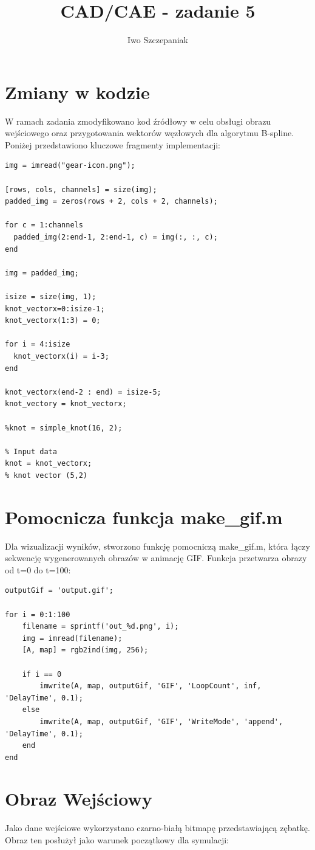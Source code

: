 \documentclass{article}
\title{CAD/CAE - zadanie 5}
\author{Iwo Szczepaniak}
\begin{document}
\maketitle

\section{Zmiany w kodzie}
W ramach zadania zmodyfikowano kod źródłowy w celu obsługi obrazu wejściowego oraz przygotowania wektorów węzłowych dla algorytmu B-spline. Poniżej przedstawiono kluczowe fragmenty implementacji:
\begin{verbatim}
img = imread("gear-icon.png");

[rows, cols, channels] = size(img);
padded_img = zeros(rows + 2, cols + 2, channels);

for c = 1:channels
  padded_img(2:end-1, 2:end-1, c) = img(:, :, c);
end

img = padded_img;

isize = size(img, 1);
knot_vectorx=0:isize-1;
knot_vectorx(1:3) = 0;

for i = 4:isize
  knot_vectorx(i) = i-3;
end

knot_vectorx(end-2 : end) = isize-5;
knot_vectory = knot_vectorx;

%knot = simple_knot(16, 2);

% Input data
knot = knot_vectorx;     
% knot vector (5,2)
\end{verbatim}

\section{Pomocnicza funkcja make\_gif.m}
Dla wizualizacji wyników, stworzono funkcję pomocniczą make\_gif.m, która łączy sekwencję wygenerowanych obrazów w animację GIF. Funkcja przetwarza obrazy od t=0 do t=100:
\begin{verbatim}
outputGif = 'output.gif';

for i = 0:1:100
    filename = sprintf('out_%d.png', i);
    img = imread(filename);
    [A, map] = rgb2ind(img, 256);
    
    if i == 0
        imwrite(A, map, outputGif, 'GIF', 'LoopCount', inf, 'DelayTime', 0.1);
    else
        imwrite(A, map, outputGif, 'GIF', 'WriteMode', 'append', 'DelayTime', 0.1);
    end
end
\end{verbatim}

\section{Obraz Wejściowy}
Jako dane wejściowe wykorzystano czarno-białą bitmapę przedstawiającą zębatkę. Obraz ten posłużył jako warunek początkowy dla symulacji:
\end{document}
